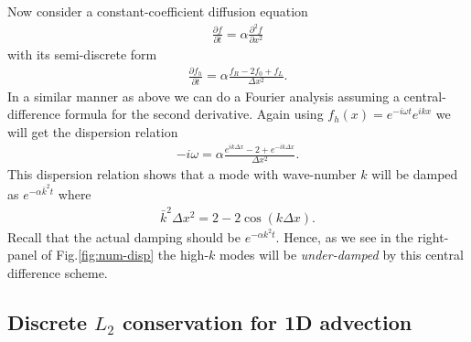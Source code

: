 \documentclass[12pt]{article}
\theoremstyle{definition}
\theoremstyle{definition}
\theoremstyle{definition}
\newcommand{\pfrac}[2]{\frac{\partial #1}{\partial #2}}
\newcommand{\pfracc}[2]{\frac{\partial^2 #1}{\partial #2^2}}
\begin{document}
Now consider a constant-coefficient diffusion equation
\begin{align}
  \pfrac{f}{t} = \alpha \pfracc{f}{x}
\end{align}
with its semi-discrete form
\begin{align}
  \pfrac{f_h}{t} = \alpha \frac{f_R - 2 f_0 + f_L}{\Delta x^2}.
\end{align}
In a similar manner as above we can do a Fourier analysis assuming a
central-difference formula for the second derivative. Again using
$f_h(x) = e^{-i\omega t} e^{ikx}$ we will get the dispersion relation
\begin{align}
  -i\omega
  =
  \alpha \frac{e^{ik \Delta x } - 2 + e^{-ik \Delta x } }{\Delta x^2}.
\end{align}
This dispersion relation shows that a mode with wave-number $k$ will
be damped as $e^{-\alpha \bar{k}^2 t}$ where
\begin{align}
  \bar{k}^2\Delta x^2 = 2 - 2 \cos(k \Delta x).
\end{align}
Recall that the actual damping should be $e^{-\alpha k^2 t}$. Hence,
as we see in the right-panel of Fig.\thinspace\ref{fig:num-disp} the
high-$k$ modes will be \emph{under-damped} by this central difference
scheme.

\subsection{Discrete $L_2$ conservation for 1D advection}
\end{document}
